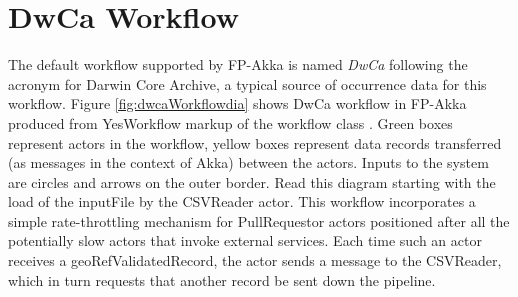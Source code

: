 \documentclass{article}
\begin{document}
\section{DwCa Workflow} \label{dwcaworkflowsec} %
The default workflow supported by FP-Akka is named \emph{DwCa} following the acronym for Darwin Core Archive, a typical source of occurrence data for this workflow. Figure \ref{fig:dwcaWorkflowdia} shows DwCa workflow in FP-Akka produced from YesWorkflow
markup of the workflow class  \citep{McPhillips2015}. 
Green boxes represent actors in the workflow, yellow boxes represent data records transferred (as messages in the context of Akka) between the actors.
Inputs to the system are circles and arrows on the outer border.
Read this diagram starting with the load of the inputFile by the CSVReader actor. This workflow incorporates a simple rate-throttling mechanism for PullRequestor actors positioned after all the potentially slow actors that invoke external services. Each time such an actor receives a geoRefValidatedRecord, the actor sends a message to the CSVReader, which in turn requests that another record be sent down the pipeline.
\end{document}

